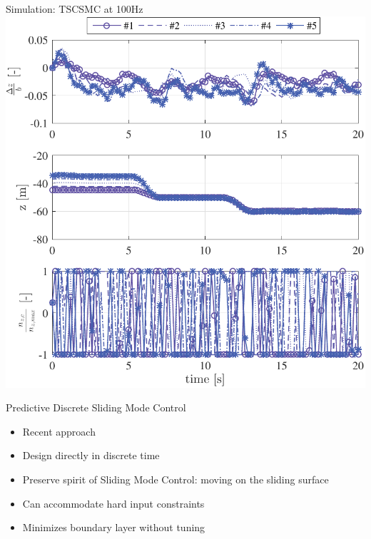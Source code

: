 \documentclass[12pt,svgnames,table,draft=false]{beamer}
\begin{document}
\begin{frame}{Simulation: TSCSMC at 100Hz}
\centering
\includegraphics[height=.6\paperwidth]{TSCSMC-100Hz-TIMESCALESEPARATION-turbulence=1}    %
\end{frame}

\usebackgroundtemplate{
}

\begin{frame}{Predictive Discrete Sliding Mode Control}
\centering
\begin{tcolorbox}[colback=blue!5!white,colframe=blue!75!black,title=PDSMC]
\begin{itemize}
\item Recent approach \cite{houda2013new}
\item Design directly in discrete time
\item Preserve spirit of Sliding Mode Control: moving on the sliding surface
\item Can accommodate hard input constraints
\item Minimizes boundary layer without tuning
\end{itemize}
\end{tcolorbox}
\end{frame}
\end{document}
